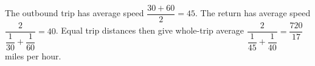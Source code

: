 The outbound trip has average speed $\dfrac{30+60}{2}=45$. The return has average speed $\dfrac{2}{\dfrac{1}{30}+\dfrac{1}{60}}=40$. Equal trip distances then give whole-trip average $\dfrac{2}{\dfrac{1}{45}+\dfrac{1}{40}}=\boxed{\dfrac{720}{17}}$ miles per hour.
